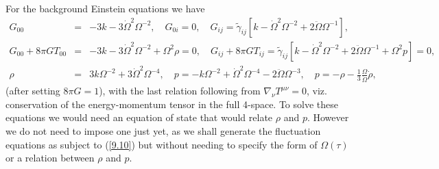 \documentclass[aps,onecolumn,10pt]{revtex4}
\numberwithin{equation}{section}
\numberwithin{equation}{section}
\begin{document}
For the background Einstein equations we have
%
\begin{eqnarray}
G_{00}&=& -3k - 3 \dot{\Omega}^2\Omega^{-2},\quad G_{0i} =0,
\quad G_{ij} = \tilde{\gamma}_{ij}\left[k - \dot\Omega^2\Omega^{-2}+ 2\ddot\Omega \Omega^{-1}\right],
 \nonumber\\
G_{00}+8\pi G T_{00} &=& -3k - 3 \dot\Omega^2\Omega^{-2} + \Omega^2 \rho=0,\quad
G_{ij}+8\pi G T_{ij}= \tilde{\gamma}_{ij}\left[k - \dot\Omega^2\Omega^{-2} + 2\ddot\Omega \Omega^{-1}  + \Omega^2 p\right]=0,
\nonumber\\
\rho &=& 3k\Omega^{-2}+3\dot\Omega^2 \Omega^{-4},\quad p = -k\Omega^{-2} + \dot\Omega^2\Omega^{-4} -2\ddot\Omega \Omega^{-3},\quad p = -\rho -\frac{1}{3} \frac{\Omega}{\dot\Omega}\dot\rho,
\label{9.10}
\end{eqnarray}
%
(after setting $8\pi G=1$), with the last relation following from $\nabla_{\nu}T^{\mu\nu}=0$, viz. conservation of the energy-momentum tensor in the full 4-space. To solve these equations we would need an equation of state that would relate $\rho$ and $p$. However we do not need to impose one just yet, as we shall generate the fluctuation equations as subject to (\ref{9.10}) but without needing to specify the form of $\Omega(\tau)$ or a relation  between $\rho$ and $p$.
\end{document}
